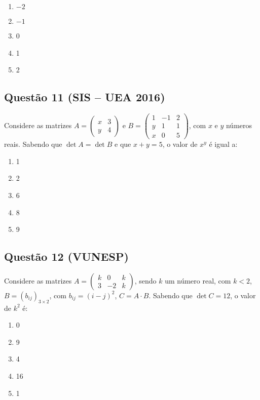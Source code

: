 \documentclass{article}
\begin{document}
\begin{multicols}{2}
		\begin{enumerate}[label=(\Alph*), noitemsep]
			\item \(-2\)
			\item \(-1\)
			\item 0
			\item 1
			\item 2
		\end{enumerate}
		
		\subsection*{Questão 11 (SIS – UEA 2016)}
		Considere as matrizes \( A = \begin{pmatrix} x & 3 \\ y & 4 \end{pmatrix} \) e \( B = \begin{pmatrix} 1 & -1 & 2 \\ y & 1 & 1 \\ x & 0 & 5 \end{pmatrix} \), com \( x \) e \( y \) números reais. Sabendo que \(\det A = \det B\) e que \( x + y = 5 \), o valor de \( x^y \) é igual a:
		
		\begin{enumerate}[label=(\Alph*), noitemsep]
			\item 1
			\item 2
			\item 6
			\item 8
			\item 9
		\end{enumerate}
		
		\subsection*{Questão 12 (VUNESP)}
		Considere as matrizes \( A = \begin{pmatrix} k & 0 & k \\ 3 & -2 & k \end{pmatrix} \), sendo \( k \) um número real, com \( k < 2 \), \( B = (b_{ij})_{3 \times 2} \), com \( b_{ij} = (i - j)^2 \), \( C = A \cdot B \). Sabendo que \(\det C = 12\), o valor de \( k^2 \) é:
		
		\begin{enumerate}[label=(\Alph*), noitemsep]
			\item 0
			\item 9
			\item 4
			\item 16
			\item 1
		\end{enumerate}
		

\end{multicols}
\end{document}
